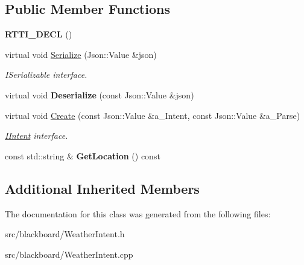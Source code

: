 \subsection*{Public Member Functions}
\begin{DoxyCompactItemize}
\item 
\mbox{\label{class_weather_intent_a4fd4cffd07f1691c9b5e2f0b81c70db8}} 
{\bfseries R\+T\+T\+I\+\_\+\+D\+E\+CL} ()
\item 
\mbox{\label{class_weather_intent_a1e6cb44a358ab6d387519a7dd20b024a}} 
virtual void \hyperlink{class_weather_intent_a1e6cb44a358ab6d387519a7dd20b024a}{Serialize} (Json\+::\+Value \&json)
\begin{DoxyCompactList}\small\item\em I\+Serializable interface. \end{DoxyCompactList}\item 
\mbox{\label{class_weather_intent_a6aaca29650f224e35ab132128eab208c}} 
virtual void {\bfseries Deserialize} (const Json\+::\+Value \&json)
\item 
\mbox{\label{class_weather_intent_a9dc479759557eebf1e81a862d53528cf}} 
virtual void \hyperlink{class_weather_intent_a9dc479759557eebf1e81a862d53528cf}{Create} (const Json\+::\+Value \&a\+\_\+\+Intent, const Json\+::\+Value \&a\+\_\+\+Parse)
\begin{DoxyCompactList}\small\item\em \hyperlink{class_i_intent}{I\+Intent} interface. \end{DoxyCompactList}\item 
\mbox{\label{class_weather_intent_a67e415efe3f7abec1eeac5d6f20fdc4b}} 
const std\+::string \& {\bfseries Get\+Location} () const
\end{DoxyCompactItemize}
\subsection*{Additional Inherited Members}


The documentation for this class was generated from the following files\+:\begin{DoxyCompactItemize}
\item 
src/blackboard/Weather\+Intent.\+h\item 
src/blackboard/Weather\+Intent.\+cpp\end{DoxyCompactItemize}
